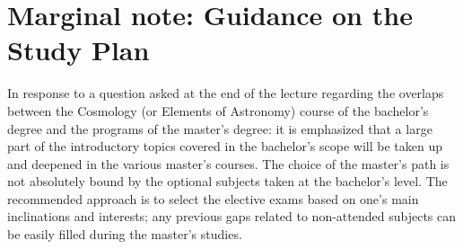 \section*{Marginal note: Guidance on the Study Plan}
In response to a question asked at the end of the lecture regarding the overlaps between the Cosmology (or Elements of Astronomy) course of the bachelor's degree and the programs of the master's degree: it is emphasized that a large part of the introductory topics covered in the bachelor's scope will be taken up and deepened in the various master's courses. The choice of the master's path is not absolutely bound by the optional subjects taken at the bachelor's level. The recommended approach is to select the elective exams based on one's main inclinations and interests; any previous gaps related to non-attended subjects can be easily filled during the master's studies.